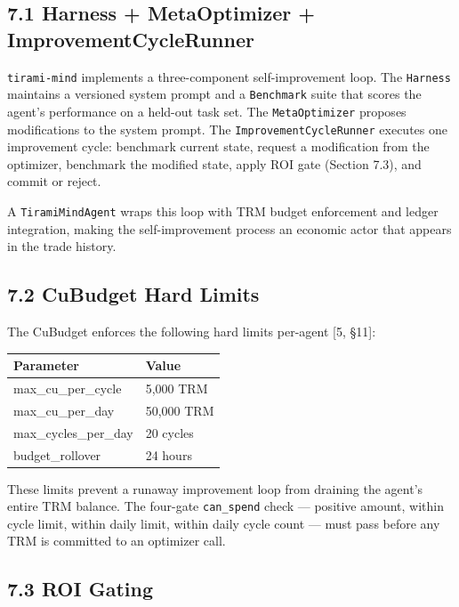 \documentclass[
  11pt,
]{article}
\newcounter{none} %
\begin{document}
\subsection{7.1 Harness + MetaOptimizer +
ImprovementCycleRunner}\label{harness-metaoptimizer-improvementcyclerunner}

\texttt{tirami-mind} implements a three-component self-improvement loop.
The \texttt{Harness} maintains a versioned system prompt and a
\texttt{Benchmark} suite that scores the agent's performance on a
held-out task set. The \texttt{MetaOptimizer} proposes modifications to
the system prompt. The \texttt{ImprovementCycleRunner} executes one
improvement cycle: benchmark current state, request a modification from
the optimizer, benchmark the modified state, apply ROI gate (Section
7.3), and commit or reject.

A \texttt{TiramiMindAgent} wraps this loop with TRM budget enforcement
and ledger integration, making the self-improvement process an economic
actor that appears in the trade history.

\subsection{7.2 CuBudget Hard Limits}\label{cubudget-hard-limits}

The CuBudget enforces the following hard limits per-agent {[}5, §11{]}:

{\def\LTcaptype{none} %
\begin{longtable}[]{@{}ll@{}}
\toprule\noalign{}
Parameter & Value \\
\midrule\noalign{}
\endhead
\bottomrule\noalign{}
\endlastfoot
max\_cu\_per\_cycle & 5,000 TRM \\
max\_cu\_per\_day & 50,000 TRM \\
max\_cycles\_per\_day & 20 cycles \\
budget\_rollover & 24 hours \\
\end{longtable}
}

These limits prevent a runaway improvement loop from draining the
agent's entire TRM balance. The four-gate \texttt{can\_spend} check ---
positive amount, within cycle limit, within daily limit, within daily
cycle count --- must pass before any TRM is committed to an optimizer
call.

\subsection{7.3 ROI Gating}\label{roi-gating}
\end{document}

